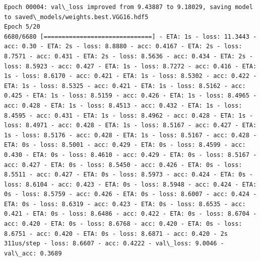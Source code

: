 \documentclass[11pt]{article}
\begin{document}
\begin{Verbatim}[commandchars=\\\{\}]
Epoch 00004: val\_loss improved from 9.43887 to 9.18029, saving model to saved\_models/weights.best.VGG16.hdf5
Epoch 5/20
6680/6680 [==============================] - ETA: 1s - loss: 11.3443 - acc: 0.30 - ETA: 2s - loss: 8.8880 - acc: 0.4167 - ETA: 2s - loss: 8.7571 - acc: 0.431 - ETA: 2s - loss: 8.5636 - acc: 0.434 - ETA: 2s - loss: 8.5923 - acc: 0.427 - ETA: 1s - loss: 8.7272 - acc: 0.416 - ETA: 1s - loss: 8.6170 - acc: 0.421 - ETA: 1s - loss: 8.5302 - acc: 0.422 - ETA: 1s - loss: 8.5325 - acc: 0.421 - ETA: 1s - loss: 8.5162 - acc: 0.425 - ETA: 1s - loss: 8.5159 - acc: 0.426 - ETA: 1s - loss: 8.4965 - acc: 0.428 - ETA: 1s - loss: 8.4513 - acc: 0.432 - ETA: 1s - loss: 8.4595 - acc: 0.431 - ETA: 1s - loss: 8.4962 - acc: 0.428 - ETA: 1s - loss: 8.4971 - acc: 0.428 - ETA: 1s - loss: 8.5167 - acc: 0.427 - ETA: 1s - loss: 8.5176 - acc: 0.428 - ETA: 1s - loss: 8.5167 - acc: 0.428 - ETA: 0s - loss: 8.5001 - acc: 0.429 - ETA: 0s - loss: 8.4599 - acc: 0.430 - ETA: 0s - loss: 8.4610 - acc: 0.429 - ETA: 0s - loss: 8.5167 - acc: 0.427 - ETA: 0s - loss: 8.5450 - acc: 0.426 - ETA: 0s - loss: 8.5511 - acc: 0.427 - ETA: 0s - loss: 8.5973 - acc: 0.424 - ETA: 0s - loss: 8.6104 - acc: 0.423 - ETA: 0s - loss: 8.5948 - acc: 0.424 - ETA: 0s - loss: 8.5759 - acc: 0.426 - ETA: 0s - loss: 8.6007 - acc: 0.424 - ETA: 0s - loss: 8.6319 - acc: 0.423 - ETA: 0s - loss: 8.6535 - acc: 0.421 - ETA: 0s - loss: 8.6486 - acc: 0.422 - ETA: 0s - loss: 8.6704 - acc: 0.420 - ETA: 0s - loss: 8.6768 - acc: 0.420 - ETA: 0s - loss: 8.6751 - acc: 0.420 - ETA: 0s - loss: 8.6871 - acc: 0.420 - 2s 311us/step - loss: 8.6607 - acc: 0.4222 - val\_loss: 9.0046 - val\_acc: 0.3689


\end{Verbatim}
\end{document}
